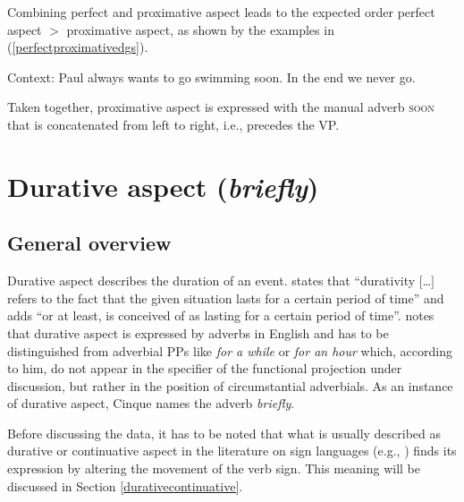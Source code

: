\noindent Combining perfect and proximative aspect leads to the expected order perfect aspect $>$ proximative aspect, as shown by the examples in (\ref{perfectproximativedgs}).

\begin{exe}
\ex Context: Paul always wants to go swimming soon. In the end we never go. \label{perfectproximativedgs}\begin{xlist} 
\end{xlist}
\end{exe} 

\noindent Taken together, proximative aspect is expressed with the manual adverb \textsc{soon} that is concatenated from left to right, i.e., precedes the VP.


\section{Durative aspect (\textit{briefly})}\label{durativeaspect}
\subsection{General overview}
Durative aspect describes the duration of an event. \citet[41]{comrie1976aspect} states that ``durativity $[$\dots $]$ refers to the fact that the given situation lasts for a certain period of time'' and adds ``or at least, is conceived of as lasting for a certain period of time''. \citet[98]{cinque1999adverbs} notes that durative aspect is expressed by adverbs in English and has to be distinguished from adverbial PPs like \textit{for a while} or \textit{for an hour} which, according to him, do not appear in the specifier of the functional projection under discussion, but rather in the position of circumstantial adverbials. As an instance of durative aspect, Cinque names the adverb \textit{briefly}. 

Before discussing the data, it has to be noted that what is usually described as durative or continuative aspect in the literature on sign languages (e.g., \citealt{klima1979signs, wilbur2004event, rathmann2005event, happ2014vork}) finds its expression by altering the movement of the verb sign. This meaning will be discussed in Section \ref{durativecontinuative}.

